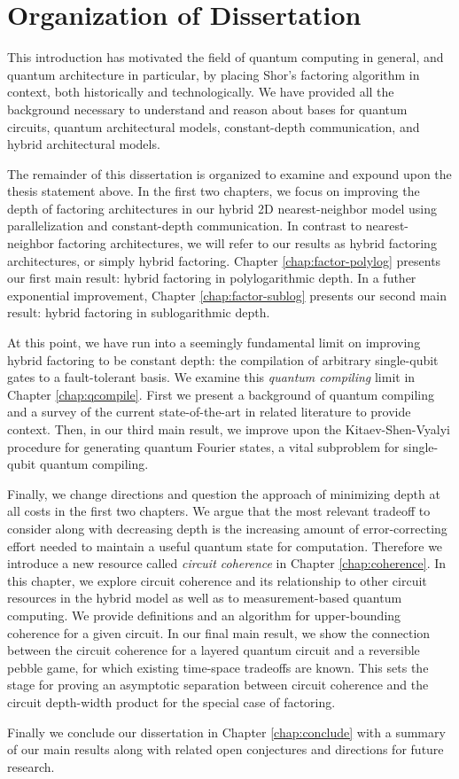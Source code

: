 \section{Organization of Dissertation}
\label{sec:intro-conclude}

This introduction has motivated the field of quantum computing in
general, and quantum architecture in particular, by placing
Shor's factoring algorithm in context, both historically and
technologically. We have provided all the background necessary
to understand and reason about bases for quantum circuits,
quantum architectural models, constant-depth communication,
and hybrid architectural models.

The remainder of this dissertation is organized to
examine and expound upon the thesis statement above. In the first two
chapters, we focus on improving the depth of factoring architectures
in our hybrid 2D nearest-neighbor model using parallelization and
constant-depth communication. In contrast to nearest-neighbor factoring
architectures, we will refer to our results as hybrid factoring architectures,
or simply hybrid factoring.
Chapter \ref{chap:factor-polylog} presents our first main result:
hybrid factoring in polylogarithmic depth.
In a futher exponential improvement, Chapter \ref{chap:factor-sublog} presents 
our second main result: hybrid factoring in sublogarithmic depth.

At this point, we have run into a seemingly fundamental limit on improving
hybrid factoring to be constant depth: the compilation of arbitrary
single-qubit gates to a fault-tolerant basis. We examine this
\emph{quantum compiling} limit in Chapter \ref{chap:qcompile}. First we
present a background of quantum compiling and a survey of the current
state-of-the-art in related literature to provide context. Then, in our
third main result, we improve
upon the Kitaev-Shen-Vyalyi procedure for generating quantum Fourier states,
a vital subproblem for single-qubit quantum compiling.

Finally, we change directions and question the approach of minimizing depth
at all costs in the first two chapters. We argue that the most relevant
tradeoff to consider along with decreasing depth is the increasing amount
of error-correcting effort needed to maintain a useful quantum state for
computation. Therefore we introduce a new resource called
\emph{circuit coherence} in Chapter \ref{chap:coherence}. In this chapter,
we explore circuit coherence and its relationship to other circuit resources
in the hybrid model as well as to measurement-based quantum computing.
We provide definitions and an algorithm for upper-bounding coherence for
a given circuit. In our final
main result, we show the connection between the circuit coherence for a
layered quantum circuit and a reversible pebble game, for which existing
time-space tradeoffs are known. This sets the stage for proving an
asymptotic separation between circuit coherence and the circuit
depth-width product for the special case of factoring.

Finally we conclude our dissertation in Chapter \ref{chap:conclude} with a
summary of our main results along with related open conjectures and
directions for future research.